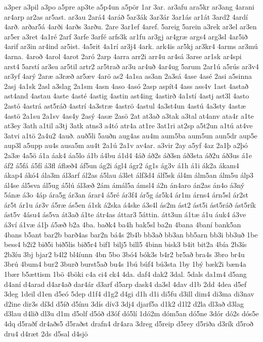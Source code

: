 {a3per
a3pil
a3po
a5pre
ap3te
a5p4un
a5pör
1ar
3ar.
ar3afu
ara5kr
ar3ang
4arani
ar4arp
ar2as
ar5ast.
ar3au
2ará4
4aráð
5ar3ák
3ar3ár
3ar1ás
ar1át
3ard2
4ardí
4arð.
arðar5á
4arði
4arðs
3arðu.
2are
3ar1ef
4aref.
5areig
5arein
a3rek
ar3el
ar3en
ar5er
a3ret
4a1ré
2arf
3arfe
3arfé
arfs3k
ar1fu
ar3gj
ar4græ
args4
arg3sl
4ar5ið
4arif
ar3in
ar4ind
ar5ist.
4a5rit
4a1rí
ar3j4
4ark.
ark4is
ar5kj
ar3kr4
4arms
ar3mú
4arna.
4aroð
4arol
4arot
2aró
2arp
4arra
arr2i
arr4u
ar4sá
3arse
ar1sk
ar4spi
arst4
5arstí
ar3su
ar5til
artr2
ar5trað
ar3u
ar4uð
4ar4ug
5arum
2ar1ú
a5rús
ar3v4
ar3yf
4arý
2aræ
a3ræð
ar5æv
4arö
as2
4a1sa
as3an
2a3sá
4ase
4asé
2asi
a5sinna
2asj
4a1sk
2asl
a3slag
2a1sm
4asn
4aso
4asó
2asp
aspít4
4ass
ass4v
1ast
4astað
ast4and
4astau
4aste
4asté
4astig
4astin
ast4ing
4astirð
4a1stí
4astj
ast3l
4asto
2astó
4astrá
ast5ráð
4astrí
4a3stræ
4aströ
4astul
4a3st4un
4astú
4a3sty
4astæ
4astö
2a1su
2a1sv
4as4y
2asý
4asæ
2asö
2at
at3að
a3tak
a3tal
at4anv
ata4r
a1te
at3ey
3ath
a1til
a3tj
3atk
atns3
a4tó
atr4a
at1re
3at1ri
at2sp
a5t2un
a1tú
at4ve
3atvi
a1tö
2a4u2
4auð.
auð5li
5auðn
aug4as
au4m
aum5ba
aum5un
aun5dr
aup5e
aup3l
a5upp
au4s
ausa5m
au4t
2a1ú
2a1v
av4ar.
a3vir
2ay
a5yf
4az
2a1þ
a2þó
2a3æ
4a5ö
á1a
áak4
áa5lo
á1b
á4bu
á1d4
4áð
áð2s
áð3sn
áð3sta
áð2u
áð3us
á1e
áf2
á5fá
á5fí
á3fl
áflæð4
áf5un
ág2i
ágl4
ágr2
ág1s
ág3v
á1h
á1i
ák2a
ákam4
ákap4
ákó4
ála3m
ál3arf
ál2as
á5lau
á3let
álf3d4
álf5sk
ál4m
álm5an
álm5u
álp3
ál4se
ál5sva
ál5ug
á5lú
ál3æð
2ám
ámál5a
ámsl4
á2n
án4aro
án2as
án4o
á3ný
5ánæ
á3o
4áp
ára5g
ár3an
árar4
á5ré
ár3f4
ár5g
ár5k4
ár1m
árns4
árn5sl
ár2st
ár5t
ár1u
ár3v
á5ræ
ás5en
á1sk
á2ska
á4ske
á3s4l
ás2m
ást2
ást5i
ást5ráð
ást5rík
ást5v
4ásu4
ás5va
át3að
á1te
átr4as
áttar3
5áttin.
átt3un
á1tæ
á1u
áuk4
á3ve
á3ví
á1væ
á1þ
á5æð
b2a
4ba.
baðk4
ba4h
bak5sl
ba2n
4bana
4baní
bank5an
4bans
b5ant
bar2b
barð4as
bar2n
bá4s
2b4b
bb3að
bb3an
bb5arn
bb3i
bb3uð
1be
bess4
b2i2
bið5i
bið5lis
bið5r4
bif1
bilj5
bill5
4binn
bisk3
b4it
bit2a
4bía
2b3ís
2b3íu
3bj
bjar2
b4l2
bl4íunn
4bn
5bo
3bó4
bók3s
b4r2
br5að
bra4s
3bro
br4u
3brú
4bum4
bur2
3burð
burst5að
bu4s
1bú
búf4
bú3sta
1by
1bý
bæk2i
bæn4a
1bær
b5ættism
1bö
4böki
c4a
ci4
ck4
4da.
daf4
dak2
3dal.
5dals
da1m4
d5ang
d4aní
d4arad
d4ar4að
dar4ár
d3arf
d5arp
dask4
da3sl
4dav
d1b
2dd
4dea
d5ef
3deg
1deil
d1en
d5eó
5dep
d1f4
d1g2
d4gi
d1h
d1i
di5fu
d3ill
dim4
di3ma
di3nav
d2ine
dir3s
dí3d
d5íð
d5ínu
3dís
dív3
3dj4
djarf5a
d1k2
d1l2
d2la
dl3að
d3lag
d3lau
d4lið
dl3u
d1m
d5olf
d5óð
d3óf
dó5lí
1dó2m
dóm5an
dó5ne
3dór
dó2s
dós5e
4dq
d5raðf
dr4aðs5
d5raðst
drafn4
dr4ara
3dreg
d5reip
d5rey
d5riða
d3rík
d5roð
dru4
d4ræt
2ds
d5sal
d4sjö
}
